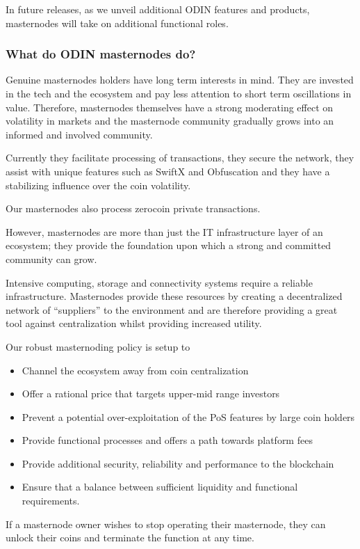 In future releases, as we unveil additional ODIN features and products, masternodes will take on additional functional roles.

\subsubsection{What do ODIN masternodes do?}
Genuine masternodes holders have long term interests in mind. They are invested in the tech and the ecosystem and pay less attention to short term oscillations in value.  Therefore, masternodes themselves have a strong moderating effect on volatility in markets and the masternode community gradually grows into an informed and involved community. 

Currently they facilitate processing of transactions, they secure the network, they assist with unique features such as SwiftX and Obfuscation and they have a stabilizing influence over the coin volatility. 

Our masternodes also process zerocoin private transactions.

However, masternodes are more than just the IT infrastructure layer of an ecosystem; they provide the foundation upon which a strong and committed community can grow.

Intensive computing, storage and connectivity systems require a reliable infrastructure.  Masternodes provide these resources by creating a decentralized network of ``suppliers'' to the environment and are therefore providing a great tool against centralization whilst providing increased utility.

Our robust masternoding policy is setup to
\begin{itemize}
   \item Channel the ecosystem away from coin centralization 
   \item Offer a rational price that targets upper-mid range investors
   \item Prevent a potential over-exploitation of the PoS features by large coin holders
   \item Provide functional processes and offers a path towards platform fees
   \item Provide additional security, reliability and performance to the blockchain
   \item Ensure that a balance between sufficient liquidity and functional requirements.
\end{itemize}
If a masternode owner wishes to stop operating their masternode, they can unlock their coins and terminate the function at any time.

